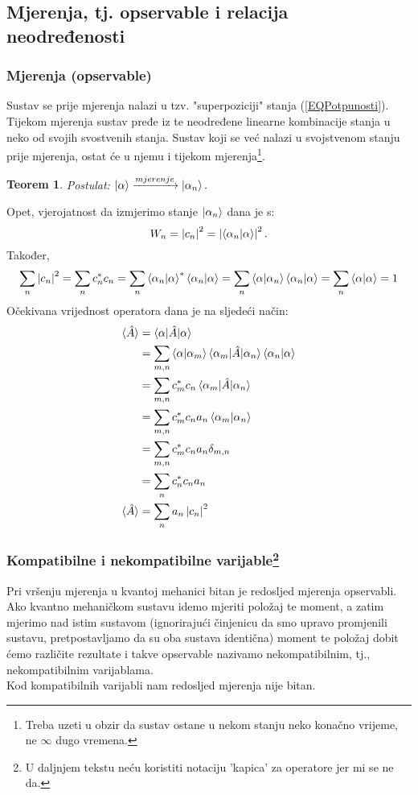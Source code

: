 \documentclass{article}
\newtheorem{theorem}{Teorem}[section]
\numberwithin{equation}{section}
\begin{document}
\subsection{Mjerenja, tj. opservable i relacija neodređenosti}
\subsubsection{Mjerenja (opservable)}
Sustav se prije mjerenja nalazi u tzv. "superpoziciji" stanja (\ref{EQPotpunosti}). Tijekom mjerenja
sustav pređe iz te neodređene linearne kombinacije stanja u neko od svojih svostvenih stanja.
Sustav koji se već nalazi u svojstvenom stanju prije mjerenja, ostat će u njemu i tijekom mjerenja\footnote{Treba uzeti u obzir da sustav ostane
u nekom stanju neko konačno vrijeme, ne $\infty$ dugo vremena.}.
\begin{theorem}
	Postulat: $\ket{\alpha} \xrightarrow{mjerenje} \ket{\alpha_n}.$
\end{theorem}
Opet, vjerojatnost da izmjerimo stanje $\ket{\alpha_n}$ dana je s: 
\begin{equation}
	W_n = \left|c_n\right|^2 = \left|\braket{\alpha_n|\alpha}\right|^2.
\end{equation}
Također,
\begin{equation}
	\sum_n \left|c_n\right|^2 = \sum_n c_n^*c_n = \sum_n \braket{\alpha_n|\alpha}^*\braket{\alpha_n|\alpha} = \sum_n \braket{\alpha|\alpha_n}\braket{\alpha_n|\alpha}
	=\sum_n \braket{\alpha|\alpha}= 1
\end{equation}
Očekivana vrijednost operatora dana je na sljedeći način:
\begin{equation}
	\begin{aligned}
		\braket{\hat{A}} &= \braket{\alpha|\hat{A}|\alpha}\\
										 &= \sum_{m,n} \braket{\alpha|\alpha_m}\braket{\alpha_m|\hat{A}|\alpha_n}\braket{\alpha_n|\alpha}\\
										 &= \sum_{m,n} c_m^*c_n \braket{\alpha_m|\hat{A}|\alpha_n}\\
										 &= \sum_{m,n} c_m^*c_n a_n \braket{\alpha_m|\alpha_n}\\
										 &= \sum_{m,n} c_m^*c_n a_n \delta_{m,n}\\
										 &= \sum_{n} c_n^*c_n a_n\\
		\braket{\hat{A}} &= \sum_n a_n \left|c_n\right|^2  
	\end{aligned}
\end{equation}
\subsubsection{Kompatibilne i nekompatibilne varijable\footnote{U daljnjem tekstu neću koristiti notaciju 'kapica' za operatore jer mi se ne da.}}
Pri vršenju mjerenja u kvantoj mehanici bitan je redosljed mjerenja opservabli. Ako kvantno mehaničkom sustavu idemo mjeriti
položaj te moment, a zatim mjerimo nad istim sustavom (ignorirajući činjenicu da smo upravo promjenili sustavu,
pretpostavljamo da su oba sustava identična) moment te položaj dobit ćemo različite rezultate i takve opservable nazivamo nekompatibilnim,
tj., nekompatibilnim varijablama.\\
Kod kompatibilnih varijabli nam redosljed mjerenja nije bitan.
\end{document}
